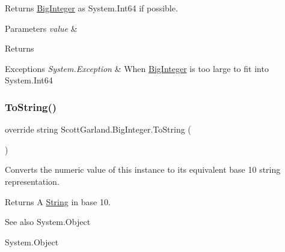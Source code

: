 Returns \hyperlink{class_scott_garland_1_1_big_integer}{Big\+Integer} as System.\+Int64 if possible. 


\begin{DoxyParams}{Parameters}
{\em value} & \\
\hline
\end{DoxyParams}
\begin{DoxyReturn}{Returns}

\end{DoxyReturn}

\begin{DoxyExceptions}{Exceptions}
{\em System.\+Exception} & When \hyperlink{class_scott_garland_1_1_big_integer}{Big\+Integer} is too large to fit into System.\+Int64\\
\hline
\end{DoxyExceptions}
\mbox{\label{class_scott_garland_1_1_big_integer_ac650e505ca8c6b7c86731ff4c158f006}} 
\subsubsection{\texorpdfstring{To\+String()}{ToString()}\hspace{0.1cm}{\footnotesize\ttfamily [1/2]}}
{\footnotesize\ttfamily override string Scott\+Garland.\+Big\+Integer.\+To\+String (\begin{DoxyParamCaption}{ }\end{DoxyParamCaption})\hspace{0.3cm}{\ttfamily [inline]}}



Converts the numeric value of this instance to its equivalent base 10 string representation. 

\begin{DoxyReturn}{Returns}
A \hyperlink{}{String} in base 10.
\end{DoxyReturn}
\begin{DoxySeeAlso}{See also}
System.\+Object


\end{DoxySeeAlso}
System.\+Object\mbox{\label{class_scott_garland_1_1_big_integer_a975b135a066ddff12cbef21adf338357}} 
